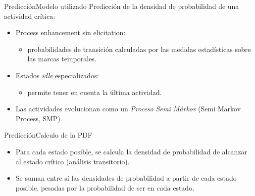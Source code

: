 \documentclass[9pt, handout]{beamer}
\begin{document}
      \begin{frame}{Predicción}{Modelo utilizado}
        \pause
        Predicción de la densidad de probabilidad de una actividad crítica:
        \pause
        \begin{itemize}
          \item Process enhancement sin elicitation:
          \begin{itemize}
            \item probabilidades de transición calculadas por las medidas estadísticas sobre las marcas temporales.
          \end{itemize}
          \pause
          \item Estados \textit{idle} especializados:
          \begin{itemize}
            \item permite tener en cuenta la última actividad.
          \end{itemize}
          \pause
          \item Las actividades evolucionan como un \textit{Proceso Semi Márkov} (Semi Markov Process, SMP).
        \end{itemize}
        
        \pause
      \end{frame}
      
      \begin{frame}{Predicción}{Calculo de la PDF}
        \pause
        \vspace{-1em}
        
      	\pause
      	\begin{itemize}
        	\item Para cada estado posible, se calcula la densidad de probabilidad de alcanzar al estado crítico (análisis transitorio).
        	\pause
        	\item Se suman entre sí las densidades de probabilidad a partir de cada estado posible, pesadas por la probabilidad de ser en cada estado.
      	\end{itemize}
      	
      	\pause
      	\vspace{-1em}
      \end{frame}
      
\end{document}
